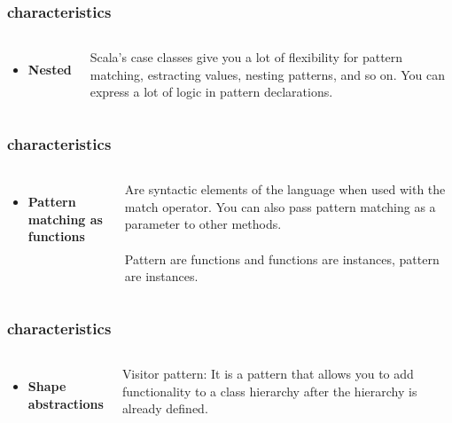 \documentclass{beamer}
\begin{document}
\begin{frame}
\frametitle{characteristics}
\begin{columns}[c]
\begin{itemize}
\item \textbf{Nested}
\end{itemize}
Scala's case classes give you a lot of flexibility for pattern matching, estracting values, nesting patterns, and so on. You can express a lot of logic in pattern declarations.
\end{columns}
\end{frame}
\begin{frame}
\frametitle{characteristics}
\begin{columns}[c]
\begin{itemize}
\item \textbf{Pattern matching as functions}
\end{itemize}
Are syntactic elements of the language when used with the match operator. You can also pass pattern matching as a parameter to other methods.
\\~\\
Pattern are functions and functions are instances, pattern are instances.
\end{columns}
\end{frame}
\begin{frame}
\frametitle{characteristics}
\begin{columns}[c]
\begin{itemize}
\item \textbf{Shape abstractions}
\end{itemize}
Visitor pattern: It is a pattern  that allows you to add functionality to a class hierarchy after the hierarchy is already defined.
\end{columns}
\end{frame}
\end{document}
